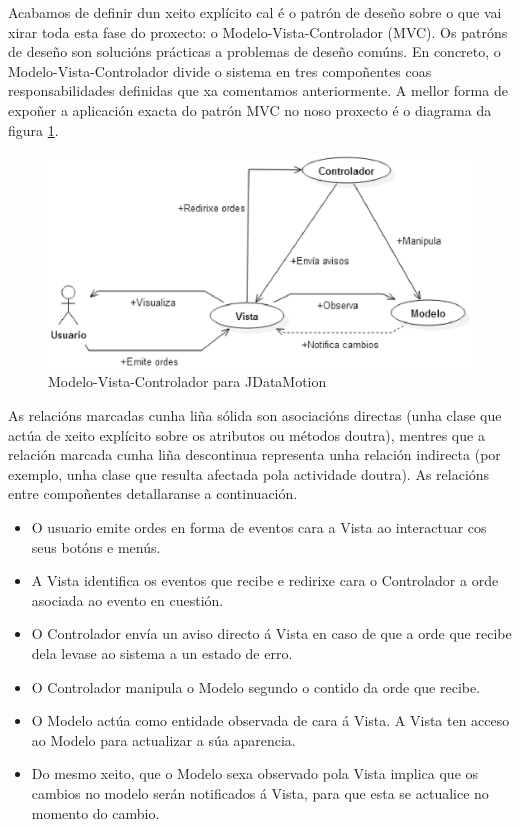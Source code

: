 Acabamos de definir dun xeito explícito cal é o patrón de deseño sobre o que vai xirar toda esta fase do proxecto: o Modelo-Vista-Controlador (MVC). Os patróns de deseño son solucións prácticas a problemas de deseño comúns. En concreto, o Modelo-Vista-Controlador divide o sistema en tres compoñentes coas responsabilidades definidas que xa comentamos anteriormente. A mellor forma de expoñer a aplicación exacta do patrón MVC no noso proxecto é o diagrama da figura \ref{MVC}.

\begin{figure}
\centering
\includegraphics[width=\textwidth,height=\textheight,keepaspectratio]{figuras/MVC}
\caption{Modelo-Vista-Controlador para JDataMotion}
\label{MVC}
\end{figure}

As relacións marcadas cunha liña sólida son asociacións directas (unha clase que actúa de xeito explícito sobre os atributos ou métodos doutra), mentres que a relación marcada cunha liña descontinua representa unha relación indirecta (por exemplo, unha clase que resulta afectada pola actividade doutra). As relacións entre compoñentes detallaranse a continuación.

\begin{itemize}
\item O usuario emite ordes en forma de eventos cara a Vista ao interactuar cos seus botóns e menús.
\item A Vista identifica os eventos que recibe e redirixe cara o Controlador a orde asociada ao evento en cuestión.
\item O Controlador envía un aviso directo á Vista en caso de que a orde que recibe dela levase ao sistema a un estado de erro.
\item O Controlador manipula o Modelo segundo o contido da orde que recibe.
\item O Modelo actúa como entidade observada de cara á Vista. A Vista ten acceso ao Modelo para actualizar a súa aparencia.
\item Do mesmo xeito, que o Modelo sexa observado pola Vista implica que os cambios no modelo serán notificados á Vista, para que esta se actualice no momento do cambio.
\end{itemize} 

